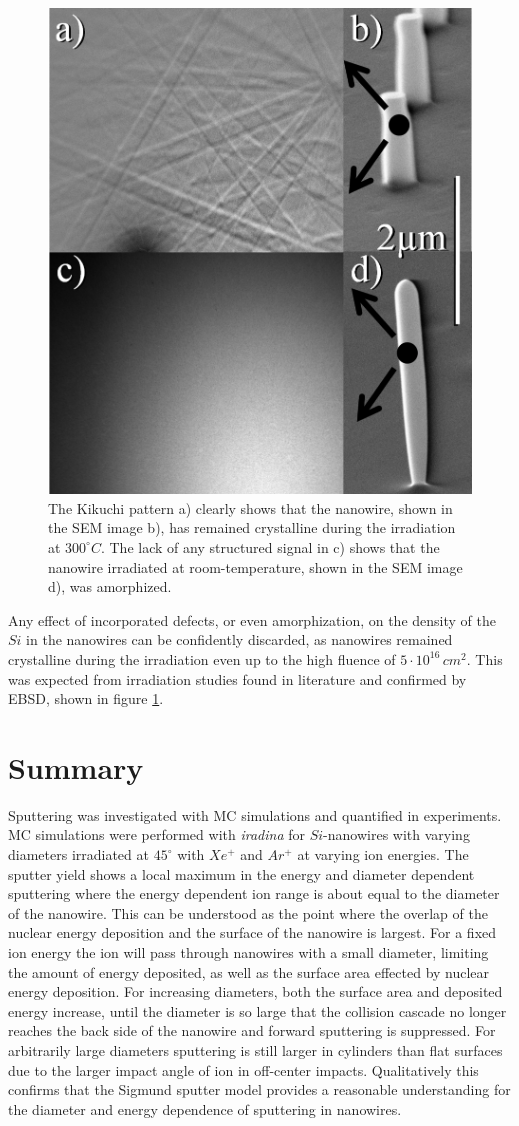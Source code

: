 \begin{figure}
	\centering
		\includegraphics[width=.4\textwidth]{images/EBSD.jpg}
	\caption{The Kikuchi pattern a) clearly shows that the nanowire, shown in the SEM image b), has remained crystalline during the irradiation at $300^\circ C$. The lack of any structured signal in c) shows that the nanowire irradiated at room-temperature, shown in the SEM image d), was amorphized.} 
	\label{EBSD}
\end{figure}

Any effect of incorporated defects, or even amorphization, on the density of the $Si$ in the nanowires can be confidently discarded, as nanowires remained crystalline during the irradiation even up to the high fluence of $5\cdot 10^{16}\,cm^2$. This was expected from irradiation studies found in literature \cite{pelaz_ion-beam-induced_2004} and confirmed by EBSD, shown in figure \ref{EBSD}.

\section{Summary}

Sputtering was investigated with MC simulations and quantified in experiments. MC simulations were performed with \emph{iradina} for $Si$-nanowires with varying diameters irradiated at $45^\circ$ with $Xe^+$ and $Ar^+$ at varying ion energies. The sputter yield shows a local maximum in the energy and diameter dependent sputtering where the energy dependent ion range is about equal to the diameter of the nanowire. This can be understood as the point where the overlap of the nuclear energy deposition and the surface of the nanowire is largest. For a fixed ion energy the ion will pass through nanowires with a small diameter, limiting the amount of energy deposited, as well as the surface area effected by nuclear energy deposition. For increasing diameters, both the surface area and deposited energy increase, until the diameter is so large that the collision cascade no longer reaches the back side of the nanowire and forward sputtering is suppressed. For arbitrarily large diameters sputtering is still larger in cylinders than flat surfaces due to the larger impact angle of ion in off-center impacts. Qualitatively this confirms that the Sigmund sputter model provides a reasonable understanding for the diameter and energy dependence of sputtering in nanowires.
 
